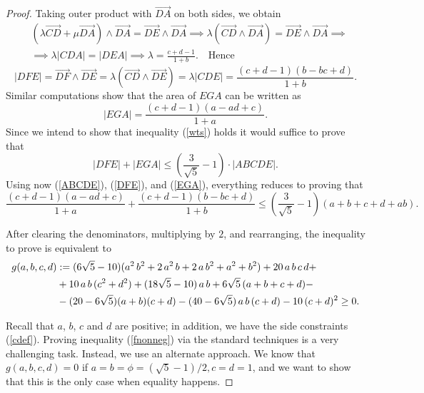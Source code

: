 \documentclass [10pt,oneside]{amsart}
\theoremstyle{definition}
\theoremstyle{plain}
\begin{document}
\begin{proof}
Taking outer product with $\overrightarrow{DA}$ on both sides, we obtain
\begin{align*}
&(\lambda\overrightarrow{CD}+\mu\overrightarrow{DA})\wedge \overrightarrow{DA}=\overrightarrow{DE} \wedge\overrightarrow{DA}
\implies \lambda(\overrightarrow{CD}\wedge\overrightarrow{DA})=\overrightarrow{DE}\wedge\overrightarrow{DA}\implies\\
&\implies \lambda|CDA|=|DEA|\implies \lambda=\frac{c+d-1}{1+b}.\quad \text{Hence}
\end{align*}
\begin{equation}\label{DFE}
|DFE|=\overrightarrow{DF}\wedge\overrightarrow{DE}=\lambda(\overrightarrow{CD}\wedge\overrightarrow{DE})=
\lambda|CDE|=\frac{(c+d-1)(b-bc+d)}{1+b}.
\end{equation}
Similar computations show that the area of $EGA$ can be written as
\begin{equation}\label{EGA}
|EGA|=\frac{(c+d-1)(a-ad+c)}{1+a}.
\end{equation}
Since we intend to show that inequality (\ref{wts}) holds it would suffice to prove that
\begin{equation}
|DFE|+|EGA|\le \left(\frac{3}{\sqrt{5}}-1\right)\cdot|ABCDE|.
\end{equation}
Using now (\ref{ABCDE}), (\ref{DFE}), and (\ref{EGA}), everything reduces to proving that
\begin{equation*}
\frac{(c+d-1)(a-ad+c)}{1+a}+\frac{(c+d-1)(b-bc+d)}{1+b}\le \left(\frac{3}{\sqrt{5}}-1\right)(a+b+c+d+ab).
\end{equation*}

After clearing the denominators, multiplying by $2$, and rearranging, the inequality to prove is equivalent to
\begin{align}\label{fnonneg}
g(a,b,c,d)&:=(6\sqrt{5} - 10)(a^2\,b^2 + 2\,a^2\,b + 2\,a\,b^2 + a^2 + b^2) + 20\,a\,b\,c\,d + \notag\\
&+10\,a\,b\,(c^2 + d^2)+ (18\sqrt{5} - 10)\,a\,b + 6\sqrt{5}\,(a + b + c + d) - \notag\\
&-(20 - 6\sqrt{5})(a + b)(c + d) -(40 - 6\sqrt{5})\,a\,b\,(c + d) - 10\,(c + d)^2 \ge 0.
\end{align}

Recall that $a$, $b$, $c$ and $d$ are positive; in addition, we have the side constraints (\ref{cdef}). Proving
inequality (\ref{fnonneg}) via the standard techniques is a very challenging task. Instead, we use an alternate approach. We know that $g(a,b,c,d)=0$ if $a=b=\phi=(\sqrt{5}-1)/2, c=d=1$, and we want to show that this is the
only case when equality happens.


\end{proof}
\end{document}
